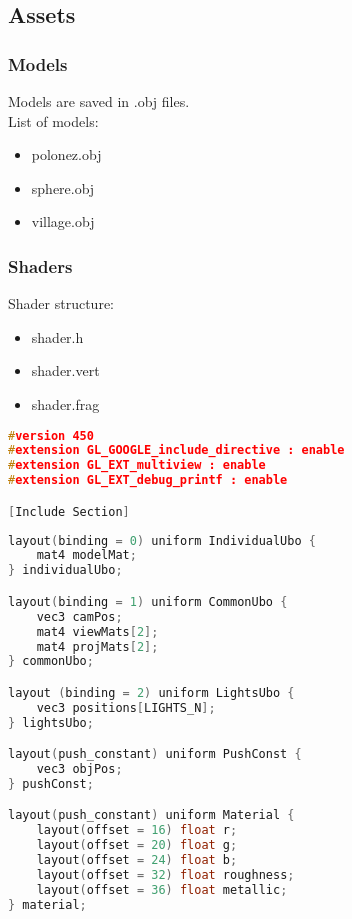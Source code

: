\newpage
\subsection{Assets}
\subsubsection{Models}
Models are saved in .obj files.\\
List of models:
\begin{itemize} %
    \item polonez.obj
    \item sphere.obj
    \item village.obj
\end{itemize}
\subsubsection{Shaders}
Shader structure:
\begin{itemize}
    \item shader.h
    \item shader.vert
    \item shader.frag
\end{itemize}

\begin{lstlisting}[language=c++, caption=Common Shader preprocessor]
#version 450
#extension GL_GOOGLE_include_directive : enable
#extension GL_EXT_multiview : enable
#extension GL_EXT_debug_printf : enable

[Include Section]
\end{lstlisting}

\begin{lstlisting}[language=c++, caption=Common Shader data]
layout(binding = 0) uniform IndividualUbo {
    mat4 modelMat;
} individualUbo;

layout(binding = 1) uniform CommonUbo {
    vec3 camPos;
    mat4 viewMats[2];
    mat4 projMats[2];
} commonUbo;

layout (binding = 2) uniform LightsUbo {
    vec3 positions[LIGHTS_N];
} lightsUbo;

layout(push_constant) uniform PushConst {
    vec3 objPos;
} pushConst;

layout(push_constant) uniform Material {
    layout(offset = 16) float r;
    layout(offset = 20) float g;
    layout(offset = 24) float b;
    layout(offset = 32) float roughness;
    layout(offset = 36) float metallic;
} material;
\end{lstlisting}

